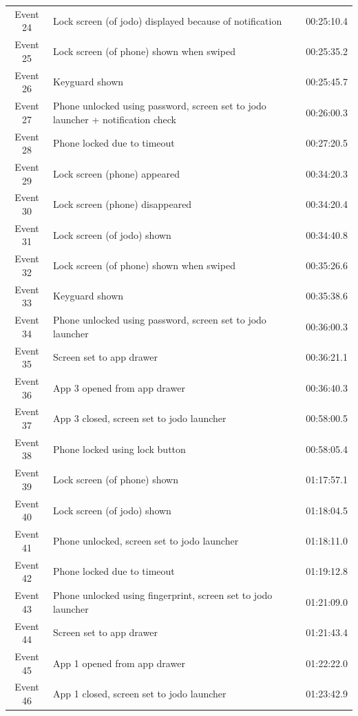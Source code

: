 \documentclass{article}
\begin{document}
\begin{enumerate}
\begin{longtable}{c p{8cm} p{3cm}}
            Event 24 & Lock screen (of jodo) displayed because of notification & 00:25:10.4 \\
            Event 25 & Lock screen (of phone) shown when swiped & 00:25:35.2 \\
            Event 26 & Keyguard shown & 00:25:45.7 \\
            Event 27 & Phone unlocked using password, screen set to jodo launcher + notification check & 00:26:00.3 \\
            Event 28 & Phone locked due to timeout & 00:27:20.5 \\
            Event 29 & Lock screen (phone) appeared & 00:34:20.3 \\
            Event 30 & Lock screen (phone) disappeared & 00:34:20.4 \\
            Event 31 & Lock screen (of jodo) shown & 00:34:40.8 \\
            Event 32 & Lock screen (of phone) shown when swiped & 00:35:26.6 \\
            Event 33 & Keyguard shown & 00:35:38.6 \\
            Event 34 & Phone unlocked using password, screen set to jodo launcher & 00:36:00.3 \\
            Event 35 & Screen set to app drawer & 00:36:21.1 \\
            Event 36 & App 3 opened from app drawer& 00:36:40.3 \\
            Event 37 & App 3 closed, screen set to jodo launcher & 00:58:00.5 \\
            Event 38 & Phone locked using lock button & 00:58:05.4 \\
            Event 39 & Lock screen (of phone) shown & 01:17:57.1 \\
            Event 40 & Lock screen (of jodo) shown & 01:18:04.5 \\
            Event 41 & Phone unlocked, screen set to jodo launcher & 01:18:11.0 \\
            Event 42 & Phone locked due to timeout & 01:19:12.8 \\
            Event 43 & Phone unlocked using fingerprint, screen set to jodo launcher & 01:21:09.0 \\
            Event 44 & Screen set to app drawer & 01:21:43.4 \\
            Event 45 & App 1 opened from app drawer & 01:22:22.0 \\
            Event 46 & App 1 closed, screen set to jodo launcher & 01:23:42.9 \\

\end{longtable}
\end{enumerate}
\end{document}
